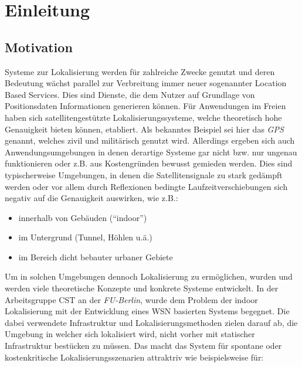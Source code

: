 \chapter{Einleitung}
\label{cha:einleitung}

\section{Motivation}
\label{sec:motivation}

Systeme zur Lokalisierung werden für zahlreiche Zwecke genutzt und deren
Bedeutung wächst parallel zur Verbreitung immer neuer sogenannter Location
Based Services.
Dies sind Dienste, die dem Nutzer auf Grundlage von Positionsdaten
Informationen generieren können. Für Anwendungen im Freien haben sich
satellitengestützte Lokalisierungssysteme, welche theoretisch hohe Genauigkeit
bieten können, etabliert. Als bekanntes Beispiel sei hier das
\textit{GPS} genannt, welches zivil und militärisch genutzt wird.
Allerdings ergeben sich auch Anwendungsumgebungen in denen derartige Systeme
gar nicht bzw. nur ungenau funktionieren oder z.B. aus Kostengründen bewusst
gemieden werden. Dies sind typischerweise Umgebungen, in denen die
Satellitensignale zu stark gedämpft werden oder vor allem durch Reflexionen
bedingte Laufzeitverschiebungen sich negativ auf die Genauigkeit auswirken,
wie z.B.: 

\begin{itemize} 
  \item innerhalb von Gebäuden (``indoor'') 
  \item im Untergrund (Tunnel, Höhlen u.ä.) 
  \item im Bereich dicht bebauter urbaner Gebiete
\end{itemize}

Um in solchen Umgebungen dennoch Lokalisierung zu ermöglichen, wurden und werden
viele theoretische Konzepte und konkrete Systeme entwickelt. In der
Arbeitsgruppe \gls{CST} an der \textit{FU-Berlin}, wurde dem Problem der
indoor Lokalisierung mit der Entwicklung eines \gls{WSN} basierten Systems
begegnet. Die dabei verwendete Infrastruktur und Lokalisierungsmethoden zielen
darauf ab, die Umgebung in welcher sich lokalisiert wird, nicht vorher mit
statischer Infrastruktur bestücken zu müssen. Das macht das System für spontane
oder kostenkritische Lokalisierungsszenarien attraktriv wie beispielsweise für:

